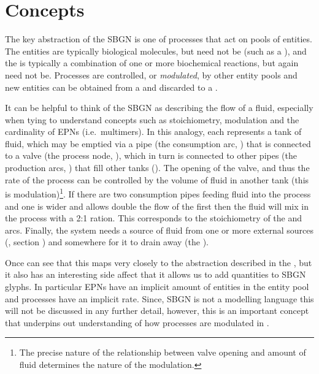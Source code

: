\section{Concepts}

The key abstraction of the SBGN \PDl is one of processes that act on pools of entities. The entities are typically biological molecules, but need not be (such as a ), and the  is typically a combination of one or more  biochemical reactions, but again need not be. Processes are controlled, or \emph{modulated}, by other entity pools and new entities can be obtained from a  and discarded to a .

It can be helpful to think of the SBGN \PD as describing the flow of a fluid, especially when tying to understand concepts such as stoichiometry, modulation and the cardinality of EPNs (i.e.\, multimers). In this analogy, each  represents a tank of fluid, which may be emptied via a pipe (the consumption arc, ) that is connected to a valve (the process node, ), which in turn is connected to other pipes (the production arcs, ) that fill other tanks (). The opening of the valve, and thus the rate of the process can be controlled by the volume of fluid in another tank (this is modulation)\footnote{The precise nature of the relationship between valve opening and amount of fluid determines the nature of the modulation.}. If there are two consumption pipes feeding fluid into the process and one is wider and allows double the flow of the first then the fluid will mix in the process with a 2:1 ration. This corresponds to the stoichiometry of the  and  arcs. Finally, the system needs a source of fluid from one or more external sources (, section ) and somewhere for it to drain away (the ).

Once can see that this maps very closely to the abstraction described in the \PDl, but it also has an interesting side affect that it allows us to add quantities to SBGN glyphs. In particular EPNs have an implicit amount of entities in the entity pool and processes have an implicit rate. Since, SBGN \PD is not a modelling language this will not be discussed in any further detail, however, this is an important concept that underpins out understanding of how processes are modulated in .


